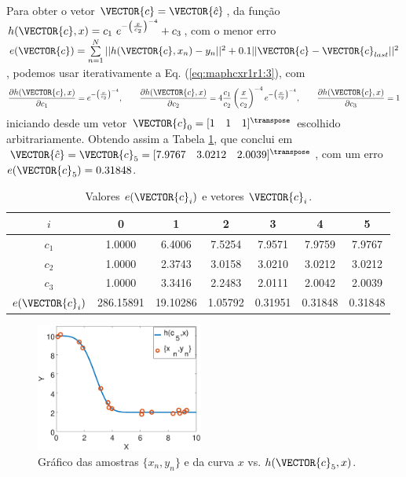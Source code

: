 \begin{SolutionT}\label{sol:theo:maphcxr1r1}
Para obter  o vetor $\VECTOR{c}=\VECTOR{\hat{c}}$, da função $h(\VECTOR{c},x) = c_1~ e^{-\left(\frac{x}{c_2}\right)^{-4}}+c_3$,
com o menor erro $e(\VECTOR{c})=\sum\limits_{n=1}^{N} ||h(\VECTOR{c},x_n)-y_n||^2 +0.1 ||\VECTOR{c}-\VECTOR{c}_{last}||^2$,
podemos usar iterativamente a Eq. (\ref{eq:maphcxr1r1:3}), com 
\begin{equation}
\frac{\partial h(\VECTOR{c},x)}{\partial c_1} 
= e^{-\left(\frac{x}{c_2}\right)^{-4}},\qquad 
\frac{\partial h(\VECTOR{c},x)}{\partial c_2} 
= 4\frac{c_1}{c_2}\left(\frac{x}{c_2}\right)^{-4}e^{-\left(\frac{x}{c_2}\right)^{-4}}, \qquad 
\frac{\partial h(\VECTOR{c},x)}{\partial c_3} 
=1
\end{equation} 
iniciando desde um vetor $\VECTOR{c}_{0}=[1\quad 1\quad 1]^{\transpose}$ escolhido arbitrariamente.
Obtendo assim a Tabela \ref{table:theo:maphcxr1r1:ei}, que conclui em
$\VECTOR{\hat{c}}=\VECTOR{c}_{5}=[7.9767\quad 3.0212\quad 2.0039]^{\transpose}$,
com  um erro $e(\VECTOR{c}_{5})=0.31848$.


\begin{table}[h!]
\centering
\begin{tabular}{|c|c|c|c|c|c|c|} 
 \hline
$i$   & 0 & 1 & 2 & 3 & 4 & 5 \\ \hline
\hline
$c_1$ & 1.0000 & 6.4006 & 7.5254 & 7.9571 & 7.9759 & 7.9767 \\ \hline
$c_2$ & 1.0000 & 2.3743 & 3.0158 & 3.0210 & 3.0212 & 3.0212 \\ \hline
$c_3$ & 1.0000 & 3.3416 & 2.2483 & 2.0111 & 2.0042 & 2.0039 \\ \hline
\hline
$e(\VECTOR{c}_{i})$ & 286.15891 & 19.10286 & 1.05792 & 0.31951 & 0.31848 & 0.31848  \\ \hline
\end{tabular}
\caption{Valores $e(\VECTOR{c}_{i})$ e vetores $\VECTOR{c}_{i}$.}
\label{table:theo:maphcxr1r1:ei}
\end{table}

    \begin{figure}[!h]
        \centering
        \includegraphics[width=0.49\textwidth]{chapters/mapeamento/mfiles/mapeamentor1r1-nonlinear/minimizando_hx.eps}
        \caption{Gráfico das amostras $\{x_n,y_n\}$ e da curva $x$ vs. $h(\VECTOR{c}_5,x)$.}
        \label{fig:theo:maphcxr1r1:xnyn}
    \end{figure}

\end{SolutionT}


